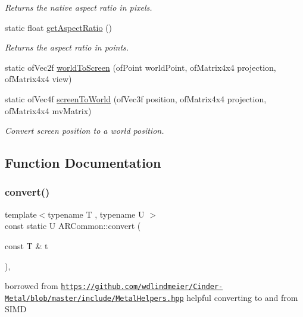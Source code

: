 \begin{DoxyCompactItemize}
\begin{DoxyCompactList}\small\item\em Returns the native aspect ratio in pixels. \end{DoxyCompactList}\item 
static float \mbox{\hyperlink{namespace_a_r_common_a5c33a5f3620614da8b3be53f6811d7ca}{get\+Aspect\+Ratio}} ()
\begin{DoxyCompactList}\small\item\em Returns the aspect ratio in points. \end{DoxyCompactList}\item 
static of\+Vec2f \mbox{\hyperlink{namespace_a_r_common_a9cd9f43005e2612ab5054dc3aec90fcf}{world\+To\+Screen}} (of\+Point world\+Point, of\+Matrix4x4 projection, of\+Matrix4x4 view)
\item 
static of\+Vec4f \mbox{\hyperlink{namespace_a_r_common_acc8f469a4596dc7173993ce58068bd2d}{screen\+To\+World}} (of\+Vec3f position, of\+Matrix4x4 projection, of\+Matrix4x4 mv\+Matrix)
\begin{DoxyCompactList}\small\item\em Convert screen position to a world position. \end{DoxyCompactList}\end{DoxyCompactItemize}


\subsection{Function Documentation}
\mbox{\label{namespace_a_r_common_ab67b42b84c068f0c4ab2401ea3af86c6}} 
\subsubsection{\texorpdfstring{convert()}{convert()}}
{\footnotesize\ttfamily template$<$typename T , typename U $>$ \\
const static U A\+R\+Common\+::convert (\begin{DoxyParamCaption}\item[{const T \&}]{t }\end{DoxyParamCaption})\hspace{0.3cm}{\ttfamily [inline]}, {\ttfamily [static]}}

borrowed from \href{https://github.com/wdlindmeier/Cinder-Metal/blob/master/include/MetalHelpers.hpp}{\tt https\+://github.\+com/wdlindmeier/\+Cinder-\/\+Metal/blob/master/include/\+Metal\+Helpers.\+hpp} helpful converting to and from S\+I\+MD \mbox{\label{namespace_a_r_common_a5a232f6315a3a5b74678034efadd5d20}} 
